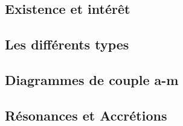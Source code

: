 \subsection{Existence et intérêt}
\subsection{Les différents types}
\subsection{Diagrammes de couple a-m}
\subsection{Résonances et Accrétions}
